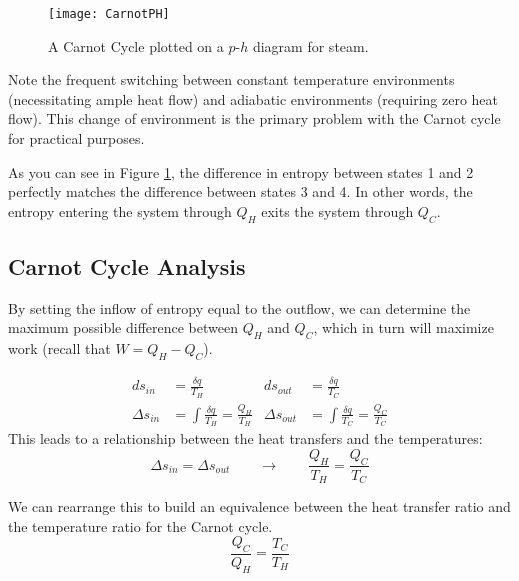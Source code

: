 
\begin{figure}[H]
  \centering
  \texttt{[image: CarnotPH]}
  \caption{A Carnot Cycle plotted on a $p$-$h$ diagram for steam.}
  \label{fig:carnotph}
\end{figure}

Note the frequent switching between constant temperature environments (necessitating ample heat flow) and adiabatic environments (requiring zero heat flow).  This change of environment is the primary problem with the Carnot cycle for practical purposes.

As you can see in Figure \ref{fig:carnotph}, the difference in entropy between states 1 and 2 perfectly matches the difference between states 3 and 4.  In other words, the entropy entering the system through $Q_H$ exits the system through $Q_C$.

\subsection{Carnot Cycle Analysis}
By setting the inflow of entropy equal to the outflow, we can determine the maximum possible difference between $Q_H$ and $Q_C$, which in turn will maximize work (recall that $W = Q_H - Q_C$).

\begin{align*}
  ds_{in} &= \frac{\delta q}{T_H} &  ds_{out} &= \frac{\delta q}{T_C}\\
  \Delta s_{in} &= \int \frac{\delta q}{T_H} = \frac{Q_H}{T_H}  &
  \Delta s_{out} &= \int \frac{\delta q}{T_C} = \frac{Q_C}{T_C} 
\end{align*}
This leads to a relationship between the heat transfers and the temperatures:
\begin{equation*}
 \Delta s_{in} = \Delta s_{out} \qquad \rightarrow \qquad \frac{Q_H}{T_H} = \frac{Q_C}{T_C}
\end{equation*}

We can rearrange this to build an equivalence between the heat transfer ratio and the temperature ratio for the Carnot cycle.
\begin{equation} \label{eq:QTequivalence}
  \frac{Q_C}{Q_H} = \frac{T_C}{T_H}
\end{equation}

